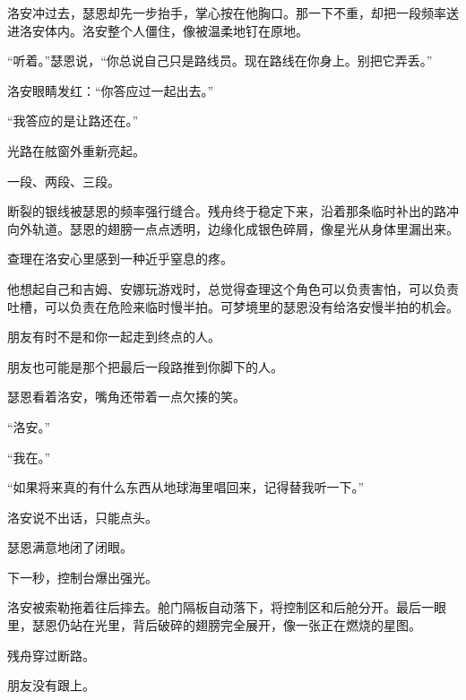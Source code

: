 洛安冲过去，瑟恩却先一步抬手，掌心按在他胸口。那一下不重，却把一段频率送进洛安体内。洛安整个人僵住，像被温柔地钉在原地。

“听着。”瑟恩说，“你总说自己只是路线员。现在路线在你身上。别把它弄丢。”

洛安眼睛发红：“你答应过一起出去。”

“我答应的是让路还在。”

光路在舷窗外重新亮起。

一段、两段、三段。

断裂的银线被瑟恩的频率强行缝合。残舟终于稳定下来，沿着那条临时补出的路冲向外轨道。瑟恩的翅膀一点点透明，边缘化成银色碎屑，像星光从身体里漏出来。

查理在洛安心里感到一种近乎窒息的疼。

他想起自己和吉姆、安娜玩游戏时，总觉得查理这个角色可以负责害怕，可以负责吐槽，可以负责在危险来临时慢半拍。可梦境里的瑟恩没有给洛安慢半拍的机会。

朋友有时不是和你一起走到终点的人。

朋友也可能是那个把最后一段路推到你脚下的人。

瑟恩看着洛安，嘴角还带着一点欠揍的笑。

“洛安。”

“我在。”

“如果将来真的有什么东西从地球海里唱回来，记得替我听一下。”

洛安说不出话，只能点头。

瑟恩满意地闭了闭眼。

下一秒，控制台爆出强光。

洛安被索勒拖着往后摔去。舱门隔板自动落下，将控制区和后舱分开。最后一眼里，瑟恩仍站在光里，背后破碎的翅膀完全展开，像一张正在燃烧的星图。

残舟穿过断路。

朋友没有跟上。
